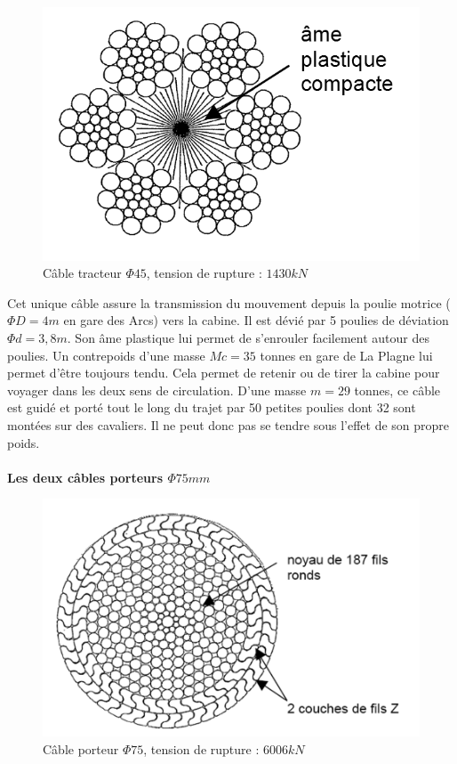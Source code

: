 \begin{figure}
	\vspace{-20pt}
	\centering \includegraphics[width=0.9\linewidth]{img/fig04}
	\caption{Câble tracteur $\Phi45$, tension de rupture : $1430kN$}
	\label{fig04}
\end{figure}

Cet unique câble assure la transmission du mouvement depuis la poulie motrice ($\Phi D=4m$ en gare des Arcs) vers la cabine. Il est dévié par 5 poulies de déviation $\Phi d=3,8m$. Son âme plastique lui permet de s'enrouler facilement autour des poulies. Un contrepoids d'une masse $Mc=35$ tonnes en gare de La Plagne lui permet d'être toujours tendu. Cela permet de retenir ou de tirer la cabine pour voyager dans les deux sens de circulation. D'une masse $m=29$ tonnes, ce câble est guidé et porté tout le long du trajet par 50 petites poulies dont 32 sont montées sur des cavaliers. Il ne peut donc pas se tendre sous l'effet de son propre poids.
\\ ~\ \\
\textbf{Les deux câbles porteurs $\Phi 75mm$}

\begin{figure}
	\vspace{-20pt}
	\centering \includegraphics[width=0.9\linewidth]{img/fig05}
	\caption{Câble porteur $\Phi75$, tension de rupture : $6006kN$}
	\label{fig05}
\end{figure}

